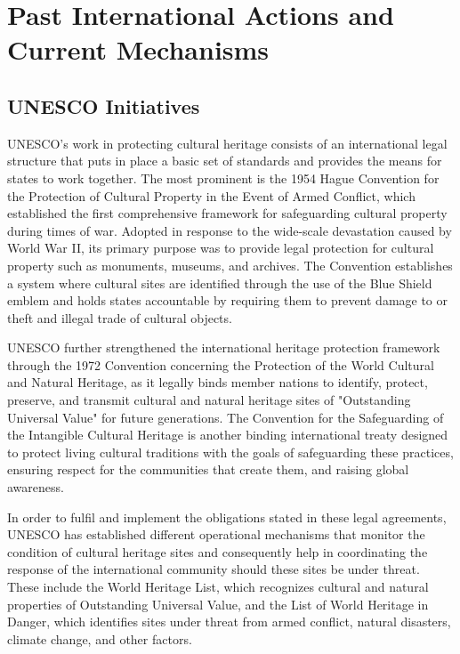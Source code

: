 \section{Past International Actions and Current Mechanisms}

\subsection{UNESCO Initiatives}

UNESCO's work in protecting cultural heritage consists of an international legal structure that puts in place a basic set of standards and provides the means for states to work together. The most prominent is the 1954 Hague Convention for the Protection of Cultural Property in the Event of Armed Conflict, which established the first comprehensive framework for safeguarding cultural property during times of war. Adopted in response to the wide-scale devastation caused by World War II, its primary purpose was to provide legal protection for cultural property such as monuments, museums, and archives. The Convention establishes a system where cultural sites are identified through the use of the Blue Shield emblem and holds states accountable by requiring them to prevent damage to or theft and illegal trade of cultural objects.

UNESCO further strengthened the international heritage protection framework through the 1972 Convention concerning the Protection of the World Cultural and Natural Heritage, as it legally binds member nations to identify, protect, preserve, and transmit cultural and natural heritage sites of "Outstanding Universal Value" for future generations. The Convention for the Safeguarding of the Intangible Cultural Heritage is another binding international treaty designed to protect living cultural traditions with the goals of safeguarding these practices, ensuring respect for the communities that create them, and raising global awareness.

In order to fulfil and implement the obligations stated in these legal agreements, UNESCO has established different operational mechanisms that monitor the condition of cultural heritage sites and consequently help in coordinating the response of the international community should these sites be under threat. These include the World Heritage List, which recognizes cultural and natural properties of Outstanding Universal Value, and the List of World Heritage in Danger, which identifies sites under threat from armed conflict, natural disasters, climate change, and other factors.

